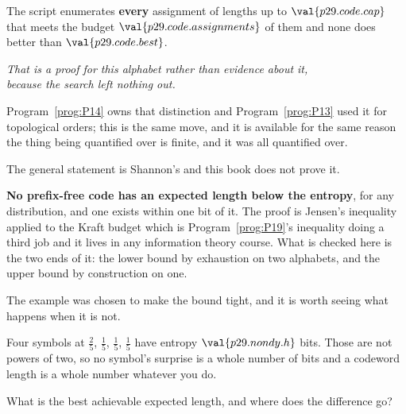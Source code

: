 \begin{fr}

The script enumerates \textbf{every} assignment of lengths up to
$\val{p29.code.cap}$ that meets the budget \dash{}
$\val{p29.code.assignments}$ of them \dash{} and none does better than
$\val{p29.code.best}$.

\begin{center}
\emph{That is a proof for this alphabet rather than evidence about it,\\
because the search left nothing out.}
\end{center}

Program~\ref{prog:P14} owns that distinction and Program~\ref{prog:P13} used
it for topological orders; this is the same move, and it is available for the
same reason \dash{} the thing being quantified over is finite, and it was all
quantified over.

The general statement is Shannon's and this book does not prove it.

\begin{rigourbox}
\textbf{No prefix-free code has an expected length below the entropy}, for any
distribution, and one exists within one bit of it. The proof is Jensen's
inequality applied to the Kraft budget \dash{} which is
Program~\ref{prog:P19}'s inequality doing a third job \dash{} and it lives in
any information theory course. What is checked here is the two ends of it: the
lower bound by exhaustion on two alphabets, and the upper bound by
construction on one.
\end{rigourbox}
\end{fr}

\begin{fr}
The example was chosen to make the bound tight, and it is worth seeing what
happens when it is not.

Four symbols at $\frac{2}{5}$, $\frac{1}{5}$, $\frac{1}{5}$, $\frac{1}{5}$
have entropy $\val{p29.nondy.h}$ bits. Those are not powers of two, so no
symbol's surprise is a whole number of bits \dash{} and a codeword length is a
whole number whatever you do.

What is the best achievable expected length, and where does the difference go?
\dotline
\nextframe
\end{fr}

